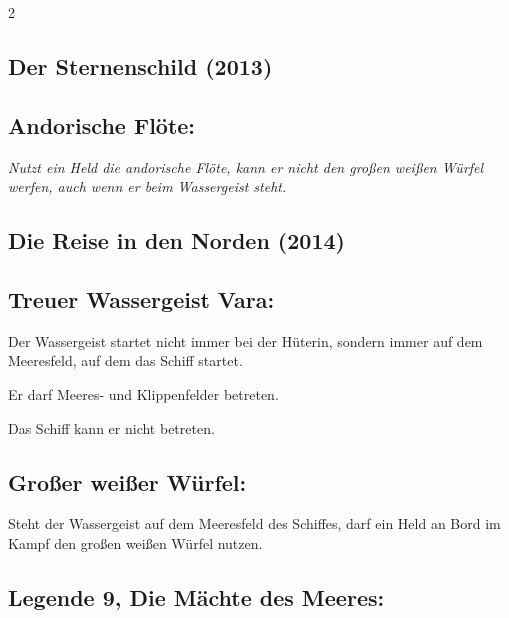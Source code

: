 \documentclass[10pt, a4paper, oneside]{book}
\newcommand{\fan}[1]{\textit{#1}}
\begin{document}
\begin{multicols*}{2}
\begin{nobgcolor}
\end{nobgcolor}

\columnbreak

\begin{bgcolor}
\section{Der Sternenschild (2013)}

\subsection{Andorische Flöte:}

\fan{Nutzt ein Held die andorische Flöte, kann er nicht den großen weißen Würfel werfen, auch wenn er beim Wassergeist steht.}

\end{bgcolor}



\begin{bgcolor}
\section{Die Reise in den Norden (2014)}



\subsection{Treuer Wassergeist Vara:}

Der Wassergeist startet nicht immer bei der Hüterin, sondern immer auf dem Meeresfeld, auf dem das Schiff startet. 
\supercite{DRidN:Begleitheft}

Er darf Meeres- und Klippenfelder betreten.
\supercite{10815,DRidN:Begleitheft,DRidN:FAQ} 

Das Schiff kann er nicht betreten.
\supercite{DRidN:Begleitheft}



\subsection{Großer weißer Würfel:}

Steht der Wassergeist auf dem Meeresfeld des Schiffes, darf ein Held an Bord im Kampf den großen weißen Würfel nutzen.
\supercite{DRidN:Begleitheft}


\subsection{Legende 9, Die Mächte des Meeres:}


\end{bgcolor}
\end{multicols*}
\end{document}
